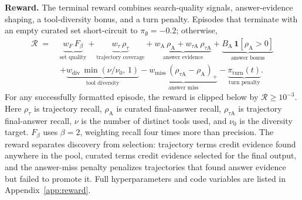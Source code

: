 \documentclass{article}
\begin{document}
\textbf{Reward.}
The terminal reward combines search-quality signals, answer-evidence shaping, a
tool-diversity bonus, and a turn penalty. Episodes that terminate with an empty
curated set short-circuit to $\pi_\emptyset=-0.2$; otherwise,
\begin{equation*}
\begin{aligned}
\mathcal{R} \;=\;& \underbrace{w_F\,F_\beta}_{\text{set quality}}
       + \underbrace{w_\tau\,\rho_\tau}_{\text{trajectory coverage}}
       + \underbrace{w_{\mathrm{A}}\,\rho_{\mathrm{A}}
                    + w_{\tau\mathrm{A}}\,\rho_{\tau\mathrm{A}}}_{\text{answer evidence}}
       + \underbrace{B_{\mathrm{A}}\,\mathbf{1}[\rho_{\mathrm{A}}>0]}_{\text{answer bonus}} \\
       & + \underbrace{w_{\mathrm{div}}\,\min(\nu/\nu_0,\,1)}_{\text{tool diversity}}
       - \underbrace{w_{\mathrm{miss}}\,(\rho_{\tau\mathrm{A}}-\rho_{\mathrm{A}})_+}_{\text{answer miss}}
       - \underbrace{\pi_{\mathrm{turn}}(t)}_{\text{turn penalty}} .
\end{aligned}
\end{equation*}
For any successfully formatted episode, the reward is clipped below by
$\mathcal{R}\geq 10^{-3}$. Here $\rho_\tau$ is trajectory recall,
$\rho_{\mathrm{A}}$ is curated final-answer recall,
$\rho_{\tau\mathrm{A}}$ is trajectory final-answer recall, $\nu$ is the number
of distinct tools used, and $\nu_0$ is the diversity target. $F_\beta$ uses
$\beta{=}2$, weighting recall four times more than precision. 
The reward separates discovery from selection: trajectory terms
credit evidence found anywhere in the pool, curated terms credit evidence
selected for the final output, and the answer-miss penalty penalizes
trajectories that found answer evidence but failed to promote it. Full
hyperparameters and code variables are listed in Appendix~\ref{app:reward}.

\end{document}
